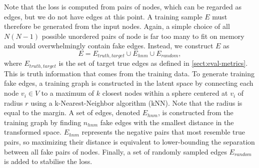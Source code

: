 Note that the loss is computed from pairs of nodes, which can be regarded as edges, but we do not have edges at this point. 
A training sample $E$ must therefore be generated from the input nodes. 
Again, a simple choice of all $N(N-1)$ possible unordered pairs of node is far too many to fit on memory and would overwhelmingly contain fake edges. 
Instead, we construct $E$ as
\begin{equation}
    \label{eq:9.7}
    {E} = E_{truth, target} \cup E_{hnm} \cup E_{random},
\end{equation}
where $E_{truth, target}$ is the set of target true edges as defined in \ref{sect:eval-metrics}. 
This is truth information that comes from the training data. 
To generate training fake edges, a training graph is constructed in the latent space by connecting each node $v_i \in V$ to a maximum of $k$ closest nodes within a sphere centered at $v_i$ of radius $r$ using a k-Nearest-Neighbor algorithm (kNN). 
Note that the radius is equal to the margin. 
A set of edges, denoted $E_{hnm}$, is constructed from the training graph by finding $n_{hnm}$ fake edges with the smallest distance in the transformed space.
$E_{hnm}$ represents the negative pairs that most resemble true pairs, so maximizing their distance is equivalent to lower-bounding the separation between all fake pairs of nodes. 
Finally, a set of randomly sampled edges $E_{random}$ is added to stabilise the loss. %

